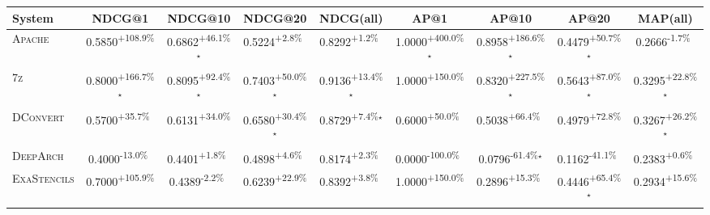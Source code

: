 \begin{table}[htbp]
\centering
\renewcommand{\arraystretch}{1.2}
\begin{tabular}{l|cccc|cccc}
\hline
System & NDCG@1 & NDCG@10 & NDCG@20 & NDCG(all) & AP@1 & AP@10 & AP@20 & MAP(all) \\ \hline
\textsc{Apache} & \cellcolor{green!30}0.5850\textsuperscript{+108.9\%}$^{\,\,\,}$ & \cellcolor{green!30}0.6862\textsuperscript{+46.1\%}$^\star$ & \cellcolor{green!30}0.5224\textsuperscript{+2.8\%}$^{\,\,\,}$ & \cellcolor{green!30}0.8292\textsuperscript{+1.2\%}$^{\,\,\,}$ & \cellcolor{green!30}1.0000\textsuperscript{+400.0\%}$^\star$ & \cellcolor{green!30}0.8958\textsuperscript{+186.6\%}$^\star$ & \cellcolor{green!30}0.4479\textsuperscript{+50.7\%}$^\star$ & \cellcolor{red!30}0.2666\textsuperscript{-1.7\%}$^{\,\,\,}$ \\
\textsc{7z} & \cellcolor{green!30}0.8000\textsuperscript{+166.7\%}$^\star$ & \cellcolor{green!30}0.8095\textsuperscript{+92.4\%}$^\star$ & \cellcolor{green!30}0.7403\textsuperscript{+50.0\%}$^\star$ & \cellcolor{green!30}0.9136\textsuperscript{+13.4\%}$^\star$ & \cellcolor{green!30}1.0000\textsuperscript{+150.0\%}$^{\,\,\,}$ & \cellcolor{green!30}0.8320\textsuperscript{+227.5\%}$^\star$ & \cellcolor{green!30}0.5643\textsuperscript{+87.0\%}$^\star$ & \cellcolor{green!30}0.3295\textsuperscript{+22.8\%}$^\star$ \\
\textsc{DConvert} & \cellcolor{green!30}0.5700\textsuperscript{+35.7\%}$^{\,\,\,}$ & \cellcolor{green!30}0.6131\textsuperscript{+34.0\%}$^{\,\,\,}$ & \cellcolor{green!30}0.6580\textsuperscript{+30.4\%}$^\star$ & \cellcolor{green!30}0.8729\textsuperscript{+7.4\%}$^\star$ & \cellcolor{green!30}0.6000\textsuperscript{+50.0\%}$^{\,\,\,}$ & \cellcolor{green!30}0.5038\textsuperscript{+66.4\%}$^{\,\,\,}$ & \cellcolor{green!30}0.4979\textsuperscript{+72.8\%}$^{\,\,\,}$ & \cellcolor{green!30}0.3267\textsuperscript{+26.2\%}$^\star$ \\
\textsc{DeepArch} & \cellcolor{red!30}0.4000\textsuperscript{-13.0\%}$^{\,\,\,}$ & \cellcolor{green!30}0.4401\textsuperscript{+1.8\%}$^{\,\,\,}$ & \cellcolor{green!30}0.4898\textsuperscript{+4.6\%}$^{\,\,\,}$ & \cellcolor{green!30}0.8174\textsuperscript{+2.3\%}$^{\,\,\,}$ & \cellcolor{red!30}0.0000\textsuperscript{-100.0\%}$^{\,\,\,}$ & \cellcolor{red!30}0.0796\textsuperscript{-61.4\%}$^\star$ & \cellcolor{red!30}0.1162\textsuperscript{-41.1\%}$^{\,\,\,}$ & \cellcolor{green!30}0.2383\textsuperscript{+0.6\%}$^{\,\,\,}$ \\
\textsc{ExaStencils} & \cellcolor{green!30}0.7000\textsuperscript{+105.9\%}$^{\,\,\,}$ & \cellcolor{red!30}0.4389\textsuperscript{-2.2\%}$^{\,\,\,}$ & \cellcolor{green!30}0.6239\textsuperscript{+22.9\%}$^{\,\,\,}$ & \cellcolor{green!30}0.8392\textsuperscript{+3.8\%}$^{\,\,\,}$ & \cellcolor{green!30}1.0000\textsuperscript{+150.0\%}$^{\,\,\,}$ & \cellcolor{green!30}0.2896\textsuperscript{+15.3\%}$^{\,\,\,}$ & \cellcolor{green!30}0.4446\textsuperscript{+65.4\%}$^\star$ & \cellcolor{green!30}0.2934\textsuperscript{+15.6\%}$^{\,\,\,}$ \\

\end{tabular}
\end{table}
